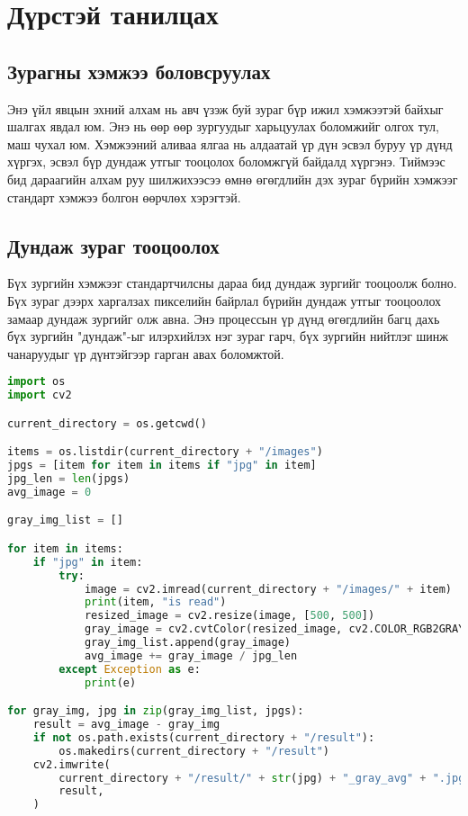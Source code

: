 \chapter{Дүрстэй танилцах}
\section{Зурагны хэмжээ боловсруулах}
Энэ үйл явцын эхний алхам нь авч үзэж буй зураг бүр ижил хэмжээтэй байхыг шалгах явдал юм. Энэ нь өөр өөр зургуудыг харьцуулах боломжийг олгох тул, маш чухал юм. Хэмжээний аливаа ялгаа нь алдаатай үр дүн эсвэл буруу үр дүнд хүргэх, эсвэл бүр дундаж утгыг тооцолох боломжгүй байдалд хүргэнэ. Тиймээс бид дараагийн алхам руу шилжихээсээ өмнө өгөгдлийн  дэх зураг бүрийн хэмжээг стандарт хэмжээ болгон өөрчлөх хэрэгтэй.

\section{Дундаж зураг тооцоолох}
Бүх зургийн хэмжээг стандартчилсны дараа бид дундаж зургийг тооцоолж болно. Бүх зураг дээрх харгалзах пикселийн байрлал бүрийн дундаж утгыг тооцоолох замаар дундаж зургийг олж авна. Энэ процессын үр дүнд өгөгдлийн багц дахь бүх зургийн "дундаж"-ыг илэрхийлэх нэг зураг гарч, бүх зургийн нийтлэг шинж чанаруудыг үр дүнтэйгээр гарган авах боломжтой.

\begin{lstlisting}[language=Python, caption=Дундаж зураг тооцоолох код, frame=single]
import os
import cv2

current_directory = os.getcwd()

items = os.listdir(current_directory + "/images")
jpgs = [item for item in items if "jpg" in item]
jpg_len = len(jpgs)
avg_image = 0

gray_img_list = []

for item in items:
    if "jpg" in item:
        try:
            image = cv2.imread(current_directory + "/images/" + item)
            print(item, "is read")
            resized_image = cv2.resize(image, [500, 500])
            gray_image = cv2.cvtColor(resized_image, cv2.COLOR_RGB2GRAY)
            gray_img_list.append(gray_image)
            avg_image += gray_image / jpg_len
        except Exception as e:
            print(e)

for gray_img, jpg in zip(gray_img_list, jpgs):
    result = avg_image - gray_img
    if not os.path.exists(current_directory + "/result"):
        os.makedirs(current_directory + "/result")
    cv2.imwrite(
        current_directory + "/result/" + str(jpg) + "_gray_avg" + ".jpg",
        result,
    )
	\end{lstlisting}
	
